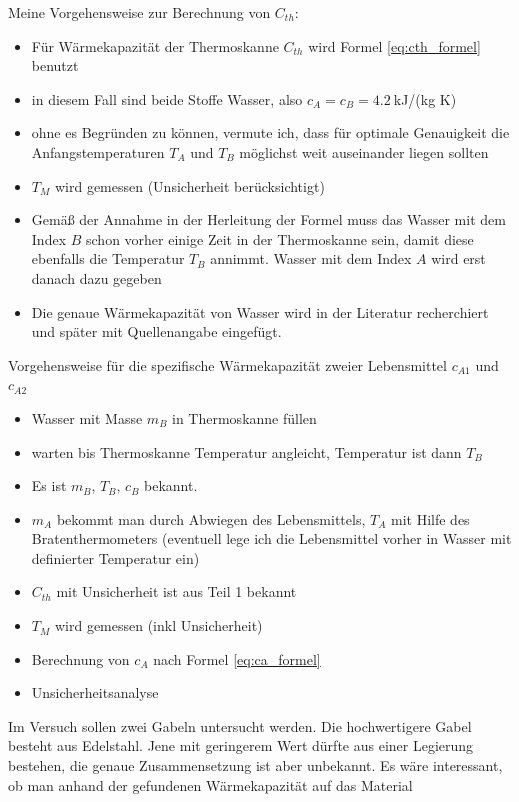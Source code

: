 \documentclass{article}
\begin{document}
Meine Vorgehensweise zur Berechnung von $C_{th}$:
\begin{itemize}
\item Für Wärmekapazität der Thermoskanne $C_{th}$ wird Formel \eqref{eq:cth_formel} benutzt
\item in diesem Fall sind beide Stoffe Wasser, also $c_A = c_B = 4.2~$kJ/(kg K)
\item ohne es Begründen zu können, vermute ich, dass für optimale Genauigkeit die Anfangstemperaturen $T_A$ und $T_B$ möglichst weit auseinander liegen sollten
\item $T_M$ wird gemessen (Unsicherheit berücksichtigt)
\item Gemäß der Annahme in der Herleitung der Formel muss das Wasser mit dem Index $B$ schon vorher einige Zeit in der Thermoskanne sein, damit diese ebenfalls die Temperatur $T_B$ annimmt. Wasser mit dem Index $A$ wird erst danach dazu gegeben
\item Die genaue Wärmekapazität von Wasser wird in der Literatur recherchiert und später mit Quellenangabe eingefügt.
\end{itemize}

Vorgehensweise für die spezifische Wärmekapazität zweier Lebensmittel $c_{A1}$ und $c_{A2}$
\begin{itemize}
\item Wasser mit Masse $m_B$ in Thermoskanne füllen 
\item warten bis Thermoskanne Temperatur angleicht, Temperatur ist dann $T_B$
\item Es ist $m_B$, $T_B$, $c_B$ bekannt.
\item $m_A$ bekommt man durch Abwiegen des Lebensmittels, $T_A$ mit Hilfe des Bratenthermometers (eventuell lege ich die Lebensmittel vorher in Wasser mit definierter Temperatur ein)
\item $C_{th}$ mit Unsicherheit ist aus Teil 1 bekannt
\item $T_M$ wird gemessen (inkl Unsicherheit)
\item Berechnung von $c_A$ nach Formel \eqref{eq:ca_formel}
\item Unsicherheitsanalyse
\end{itemize}


Im Versuch sollen zwei Gabeln untersucht werden. Die hochwertigere Gabel besteht aus Edelstahl. Jene mit geringerem Wert dürfte aus einer Legierung bestehen, die genaue Zusammensetzung ist aber unbekannt. Es wäre interessant, ob man anhand der gefundenen Wärmekapazität auf das Material 
\end{document}
